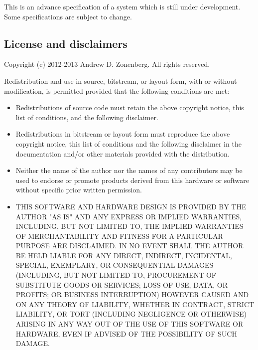 \documentclass[twocolumn]{article}
\begin{document}
This is an advance specification of a system which is still under development. Some specifications are subject to 
change.

\subsection{License and disclaimers}
                                                                                                                   
Copyright (c) 2012-2013 Andrew D. Zonenberg. All rights reserved.

Redistribution and use in source, bitstream, or layout form, with or without modification, is permitted
provided that the following conditions are met:

\begin{itemize}
\item Redistributions of source code must retain the above copyright notice, this list of conditions, and the following
disclaimer.

\item Redistributions in bitstream or layout form must reproduce the above copyright notice, this list of conditions and
the following disclaimer in the documentation and/or other materials provided with the distribution.

\item Neither the name of the author nor the names of any contributors may be used to endorse or promote products
derived from this hardware or software without specific prior written permission.

\item THIS SOFTWARE AND HARDWARE DESIGN IS PROVIDED BY THE AUTHOR "AS IS" AND ANY EXPRESS OR IMPLIED WARRANTIES, 
INCLUDING, BUT NOT LIMITED TO, THE IMPLIED WARRANTIES OF MERCHANTABILITY AND FITNESS FOR A PARTICULAR PURPOSE ARE 
DISCLAIMED. IN NO EVENT SHALL THE AUTHOR BE HELD LIABLE FOR ANY DIRECT, INDIRECT, INCIDENTAL, SPECIAL, EXEMPLARY, OR 
CONSEQUENTIAL DAMAGES (INCLUDING, BUT NOT LIMITED TO, PROCUREMENT OF SUBSTITUTE GOODS OR SERVICES; LOSS OF USE, 
DATA, OR PROFITS; OR BUSINESS INTERRUPTION) HOWEVER CAUSED AND ON ANY THEORY OF LIABILITY, WHETHER IN CONTRACT, 
STRICT LIABILITY, OR TORT (INCLUDING NEGLIGENCE OR OTHERWISE) ARISING IN ANY WAY OUT OF THE USE OF THIS SOFTWARE OR 
HARDWARE, EVEN IF ADVISED OF THE POSSIBILITY OF SUCH DAMAGE.

\end{itemize}
\end{document}
